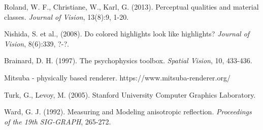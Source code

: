 \begin{thebibliography}{9}%


    Roland, W. F., Christiane, W., Karl, G. (2013).
    Perceptual qualities and material classes.
    {\it Journal of Vision}, 13(8):9, 1-20.

    Nishida, S. et al., (2008).
    Do colored highlights look like highlights?
    {\it Journal of Vision}, 8(6):339, ?-?.


    Brainard, D. H. (1997).
    The psychophysics toolbox.
    {\it Spatial Vision}, 10, 433-436.


    Mitsuba - physically based renderer. https://www.mitsuba-renderer.org/

    Turk, G., Levoy, M. (2005).
    Stanford University Computer Graphics Laboratory.

    Ward, G. J. (1992).
    Measuring and Modeling anisotropic reflection.
    {\it Proceedings of the 19th SIG-GRAPH}, 265-272.



\end{thebibliography}
